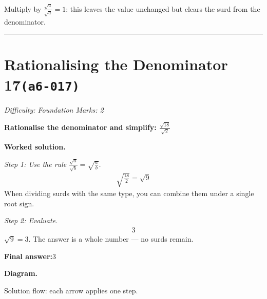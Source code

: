 \documentclass[11pt]{article}
\newcommand{\question}[1]{\par\medskip\noindent\textbf{#1}\par}
\begin{document}
\begin{center}
\end{center}
\small Multiply by $\frac{\sqrt{a}}{\sqrt{a}}=1$: this leaves the value unchanged but clears the surd from the denominator.\normalsize

\medskip\hrule

\section*{Rationalising the Denominator 17\quad\small\texttt{(a6-017)}}
\textit{Difficulty: Foundation \quad\textbar\quad Marks: 2}

\question{Rationalise the denominator and simplify: \( \frac{\sqrt{18}}{\sqrt{2}} \)}

\textbf{Worked solution.}

\textit{Step 1: Use the rule \( \frac{\sqrt{a}}{\sqrt{b}} = \sqrt{\frac{a}{b}} \).}
\[\begin{gathered}
\sqrt{\frac{18}{2}} = \sqrt{9}
\end{gathered}\]
When dividing surds with the same type, you can combine them under a single root sign.

\textit{Step 2: Evaluate.}
\[\begin{gathered}
3
\end{gathered}\]
\( \sqrt{9} = 3 \). The answer is a whole number — no surds remain.

\begin{answerbox}
\textbf{Final answer:}\quad \(\displaystyle 3\)
\end{answerbox}
\textbf{Diagram.}

\begin{center}
\end{center}
\small Solution flow: each arrow applies one step.\normalsize
\end{document}

